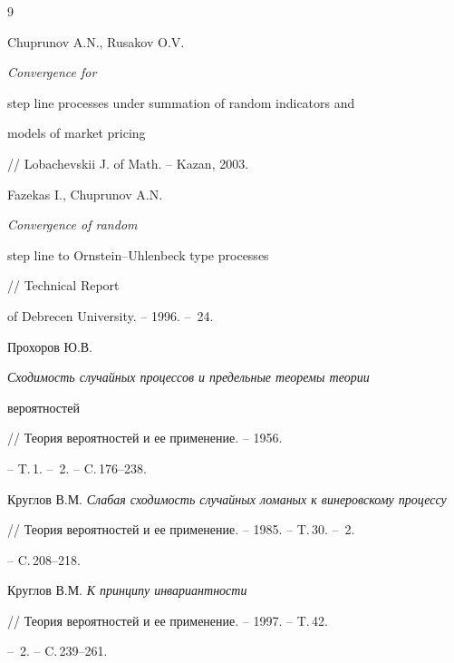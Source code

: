 \begin{thebibliography}{9}







Chuprunov A.N., Rusakov O.V. {\it Convergence for


step line processes under summation of random indicators and


models of market pricing} // Lobachevskii J. of Math. -- Kazan, 2003.




Fazekas I., Chuprunov A.N. {\it Convergence of random


step line to Ornstein--Uhlenbeck type processes} // Technical Report


of Debrecen University. -- 1996. -- \No\,24.




Прохоров Ю.В. {\it Сходимость случайных процессов и предельные теоремы теории


вероятностей} // Теория вероятностей и ее применение. -- 1956.


-- T.\,1. -- \No\,2. -- C.\,176--238.




Круглов В.М. {\it Слабая сходимость случайных ломаных к винеровскому процессу}


//  Теория вероятностей и ее применение. -- 1985. -- T.\,30. -- \No\,2.


-- C.\,208--218.




Круглов В.М. {\it К принципу инвариантности}


// Теория вероятностей и ее применение. -- 1997. -- T.\,42.


-- \No\,2. -- C.\,239--261.








\end{thebibliography}





\vskip 2cm












\label{end}











